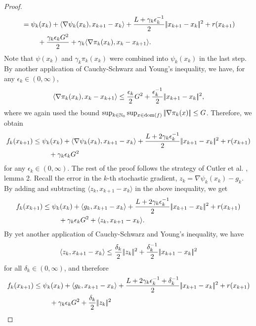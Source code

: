 \begin{proof}
\begin{align*}
        &= \psi_k(x_k) + \langle \nabla \psi_k(x_k), x_{k+1} - x_k \rangle + \frac{L + \gamma_k\epsilon_k^{-1}}{2} |\!|x_{k+1} - x_k|\!|^2 + r(x_{k+1}) \\
        &\phantom{===} + \frac{\gamma_k \epsilon_k G^2}{2} + \gamma_k \langle \nabla \pi_k(x_k), x_k - x_{k+1} \rangle.
    \end{align*}
    Note that $\psi(x_k)$ and $\gamma_k\pi_k(x_k)$ were combined into $\psi_k(x_k)$ in the last step.
    By another application of Cauchy-Schwarz and Young's inequality, we have, for any $\epsilon_k\in(0,\infty)$,
    \[
         \langle \nabla \pi_k(x_k), x_k - x_{k+1} \rangle \leq \frac{\epsilon_k}{2} G^2 + \frac{\epsilon_k^{-1}}{2} |\!|x_{k+1} - x_k|\!|^2,
    \]
    where we again used the bound $\sup_{k\in\mathbb{N}_0}\sup_{x\in\operatorname{dom}(f)} |\!|\nabla \pi_k(x)|\!| \leq G$.
    Therefore, we obtain
    \begin{align*}
        f_k(x_{k+1})
        &\leq \psi_k(x_k) + \langle \nabla \psi_k(x_k), x_{k+1} - x_k \rangle + \frac{L + 2\gamma_k\epsilon_k^{-1}}{2} |\!|x_{k+1} - x_k|\!|^2 + r(x_{k+1}) \\
        &\phantom{===} + \gamma_k \epsilon_k G^2
    \end{align*}
    for any $\epsilon_k\in(0,\infty)$. The rest of the proof follows
    the strategy of Cutler et al. \cite{cutler2023stochastic}, lemma 2. Recall the
    error in the $k$-th stochastic gradient, $z_k = \nabla \psi_k(x_k) - g_k$.
    By adding and subtracting $\langle z_k, x_{k+1} - x_k \rangle$ in
    the above inequality, we get
    \begin{align*}
        f_k(x_{k+1})
        &\leq \psi_k(x_k) + \langle g_k, x_{k+1} - x_k \rangle + \frac{L + 2\gamma_k\epsilon_k^{-1}}{2} |\!|x_{k+1} - x_k|\!|^2 + r(x_{k+1}) \\
        &\phantom{===} + \gamma_k \epsilon_k G^2 + \langle z_k, x_{k+1} - x_k \rangle.
    \end{align*}
    By yet another application of Cauchy-Schwarz and Young's inequality, we have
    \[
        \langle z_k, x_{k+1} - x_k \rangle
        \leq
        \frac{\delta_k}{2}|\!|z_k|\!|^2 + \frac{\delta_k^{-1}}{2}|\!|x_{k+1} - x_k|\!|^2
    \]
    for all $\delta_k\in(0,\infty)$, and therefore
    \begin{align*}
        f_k(x_{k+1})
        &\leq \psi_k(x_k) + \langle g_k, x_{k+1} - x_k \rangle
            + \frac{L + 2\gamma_k\epsilon_k^{-1} + \delta_k^{-1}}{2} \norm{x_{k+1} - x_k}^2 + r(x_{k+1}) \\
        &\phantom{===} + \gamma_k \epsilon_k G^2 + \frac{\delta_k}{2} \norm{z_k}^2 \\

\end{align*}
\end{proof}
